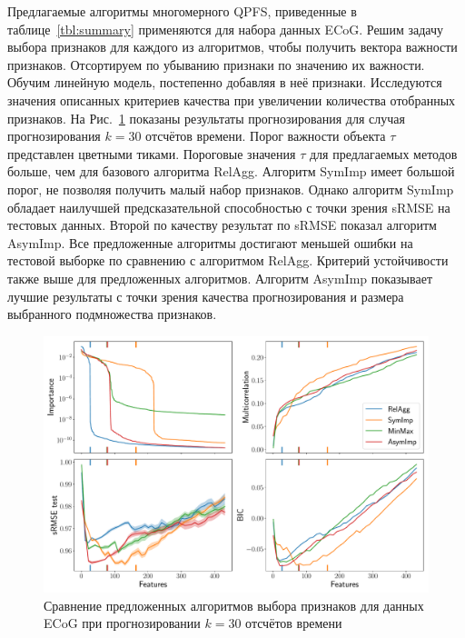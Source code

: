 \documentclass[preprint,12pt]{elsarticle}
\theoremstyle{definition}
\begin{document}
Предлагаемые алгоритмы многомерного QPFS, приведенные в таблице~\ref{tbl:summary} применяются для набора данных ECoG. 
Решим задачу выбора признаков для каждого из алгоритмов, чтобы получить вектора важности признаков. 
Отсортируем по убыванию признаки по значению их важности. Обучим линейную модель, постепенно добавляя в неё признаки. 
Исследуются значения описанных критериев качества при увеличении количества отобранных признаков. 
На Рис.~\ref{fig:ecog_3_30_metrics} показаны результаты прогнозирования для случая прогнозирования $k = 30$ отсчётов времени. 
Порог важности объекта $\tau$ представлен цветными тиками. 
Пороговые значения $\tau$ для предлагаемых методов больше, чем для базового алгоритма RelAgg. 
Алгоритм SymImp имеет большой порог, не позволяя получить малый набор признаков.
Однако алгоритм SymImp обладает наилучшей предсказательной способностью с точки зрения sRMSE на тестовых данных.
Второй по качеству результат по sRMSE показал алгоритм AsymImp.
Все предложенные алгоритмы достигают меньшей ошибки на тестовой выборке по сравнению с алгоритмом RelAgg. 
Критерий устойчивости также выше для предложенных алгоритмов.
Алгоритм AsymImp показывает лучшие результаты с точки зрения качества прогнозирования и размера выбранного подмножества признаков.

\begin{figure}[h]
	\includegraphics[width=\linewidth]{figs/ecog_3_30_metrics.pdf}
	\caption{Сравнение предложенных алгоритмов выбора признаков для данных ECoG при прогнозировании $k = 30$ отсчётов времени}
	\label{fig:ecog_3_30_metrics}
\end{figure}
\end{document}
